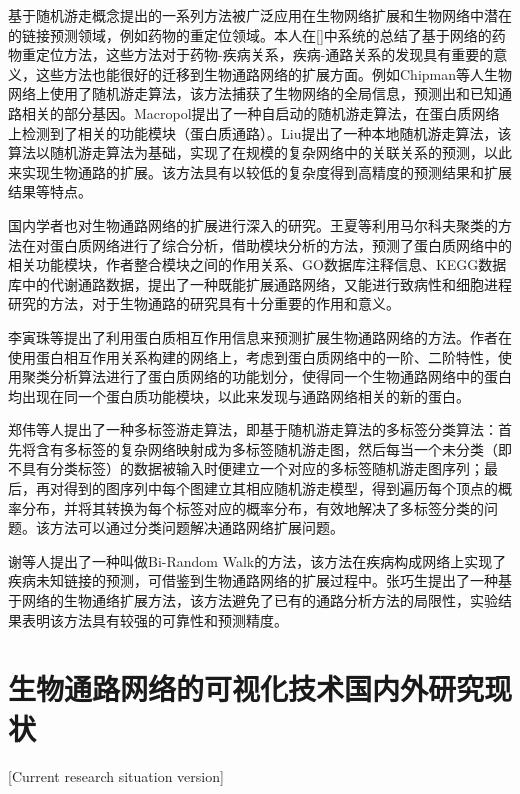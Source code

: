 基于随机游走概念提出的一系列方法被广泛应用在生物网络扩展和生物网络中潜在的链接预测领域，例如药物的重定位领域。本人在[]中系统的总结了基于网络的药物重定位方法，这些方法对于药物-疾病关系，疾病-通路关系的发现具有重要的意义，这些方法也能很好的迁移到生物通路网络的扩展方面。例如Chipman\cite{chipman2009predicting}等人生物网络上使用了随机游走算法，该方法捕获了生物网络的全局信息，预测出和已知通路相关的部分基因。Macropol\cite{Macropol}提出了一种自启动的随机游走算法，在蛋白质网络上检测到了相关的功能模块（蛋白质通路）。Liu\cite{liu2010link}提出了一种本地随机游走算法，该算法以随机游走算法为基础，实现了在规模的复杂网络中的关联关系的预测，以此来实现生物通路的扩展。该方法具有以较低的复杂度得到高精度的预测结果和扩展结果等特点。


国内学者也对生物通路网络的扩展进行深入的研究。王夏\cite{王夏2009大肠杆菌}等利用马尔科夫聚类的方法在对蛋白质网络进行了综合分析，借助模块分析的方法，预测了蛋白质网络中的相关功能模块，作者整合模块之间的作用关系、GO数据库注释信息、KEGG\cite{kanehisa2008kegg}数据库中的代谢通路数据，提出了一种既能扩展通路网络，又能进行致病性和细胞进程研究的方法，对于生物通路的研究具有十分重要的作用和意义。

李寅珠\cite{李寅珠2012基于蛋白质相互作用网络的代谢}等提出了利用蛋白质相互作用信息来预测扩展生物通路网络的方法。作者在使用蛋白相互作用关系构建的网络上，考虑到蛋白质网络中的一阶、二阶特性，使用聚类分析算法进行了蛋白质网络的功能划分，使得同一个生物通路网络中的蛋白均出现在同一个蛋白质功能模块，以此来发现与通路网络相关的新的蛋白。

郑伟\cite{郑伟2010一种基于随机游走模型的多标签分类算法}等人提出了一种多标签游走算法，即基于随机游走算法的多标签分类算法：首先将含有多标签的复杂网络映射成为多标签随机游走图，然后每当一个未分类（即不具有分类标签）的数据被输入时便建立一个对应的多标签随机游走图序列；最后，再对得到的图序列中每个图建立其相应随机游走模型，得到遍历每个顶点的概率分布，并将其转换为每个标签对应的概率分布，有效地解决了多标签分类的问题。该方法可以通过分类问题解决通路网络扩展问题。

谢\cite{xie2012prioritizing}等人提出了一种叫做Bi-Random Walk的方法，该方法在疾病构成网络上实现了疾病未知链接的预测，可借鉴到生物通路网络的扩展过程中。张巧生\cite{zhang2016network}提出了一种基于网络的生物通络扩展方法，该方法避免了已有的通路分析方法的局限性，实验结果表明该方法具有较强的可靠性和预测精度。

\section{生物通路网络的可视化技术国内外研究现状}[Current research situation version]

